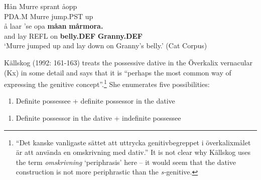 
\ea\label{}
\gll Hån  Murre  sprant  åopp\\
PDA.M  Murre  jump.PST  up\\
\gll å  laar  ’se  opa  \textbf{måan} \textbf{mårmora.}\\
and  lay  REFL  on  \textbf{belly.DEF} \textbf{Granny.DEF}\\
\glt ‘Murre jumped up and lay down on Granny’s belly.’ (Cat Corpus)
\z

Källskog (1992: 161-163) treats the possessive dative in the Överkalix vernacular (Kx) in some detail and says that it is “perhaps the most common way of expressing the genitive concept”.\footnote{ “Det kanske vanligaste sättet att uttrycka genitivbegreppet i överkalixmålet är att använda en omskrivning med dativ.” It is not clear why Källskog uses the term \textit{omskrivning} ‘periphrasis’ here – it would seem that the dative construction is not more periphrastic than the \textit{s-}genitive.} She enumerates five possibilities:

\begin{enumerate}
\item[1] Definite possessee + definite possessor in the dative
\end{enumerate}


\ea\label{}

\z 
\z 

\begin{enumerate}
\item[2] Definite possessor in the dative + indefinite possessee
\end{enumerate} 

\ea\label{}

